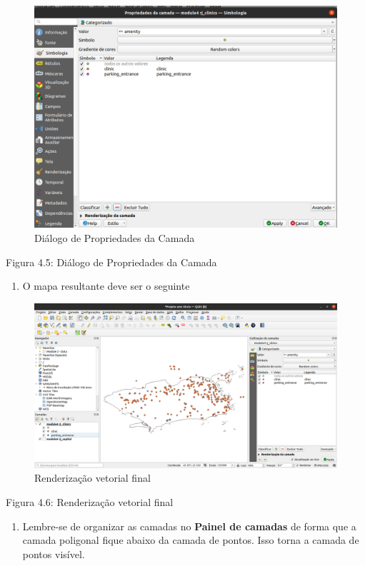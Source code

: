 \documentclass[
  portuguese,
]{krantz}
\providecommand{\tightlist}{%
  \setlength{\itemsep}{0pt}\setlength{\parskip}{0pt}}
\begin{document}
\begin{figure}
\centering
\includegraphics{media/modulo4/vector-style.png}
\caption{Diálogo de Propriedades da Camada}
\end{figure}

Figura 4.5: Diálogo de Propriedades da Camada

\begin{enumerate}
\def\labelenumi{\arabic{enumi}.}
\setcounter{enumi}{9}
\tightlist
\item
  O mapa resultante deve ser o seguinte
\end{enumerate}

\begin{figure}
\centering
\includegraphics{media/modulo4/final-vector-render.png}
\caption{Renderização vetorial final}
\end{figure}

Figura 4.6: Renderização vetorial final

\begin{enumerate}
\def\labelenumi{\arabic{enumi}.}
\setcounter{enumi}{10}
\tightlist
\item
  Lembre-se de organizar as camadas no \textbf{Painel de camadas} de forma que a camada poligonal fique abaixo da camada de pontos. Isso torna a camada de pontos visível.
\end{enumerate}
\end{document}

